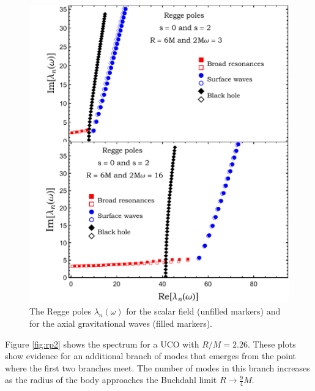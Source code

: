 \documentclass[aps,prd,longbibliography,reprint,twocolumn,amsmath,amssymb,amsfonts,showpacs,footnote,superscriptaddress]{revtex4-1}%
\begin{document}
\begin{figure}[htb]
\centering
 \includegraphics[scale=0.50]{RP_R_6_2Mw_3_16_s_0_s_2}
\caption{\label{RP_R6_approx_2Mw_3_6_s_1} The Regge poles $\lambda_n(\omega)$ for the scalar field (unfilled markers) and for the axial gravitational waves (filled markers). %
}
\label{fig:rp1}
\end{figure}

Figure \ref{fig:rp2} shows the spectrum for a UCO with $R/M = 2.26$. These plots show evidence for an additional branch of modes that emerges from the point where the first two branches meet. The number of modes in this branch increases as the radius of the body approaches the Buchdahl limit $R \rightarrow \tfrac{9}{4}M$.
\end{document}
